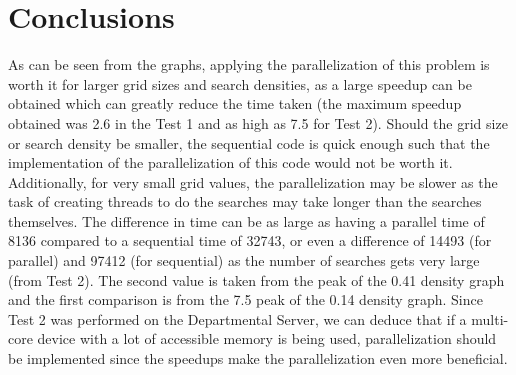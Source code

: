 \documentclass{assignment}
\begin{document}
\section{Conclusions}
As can be seen from the graphs, applying the parallelization of this problem is worth it for larger grid sizes and search densities, as a large speedup can be obtained which can greatly reduce the time taken (the maximum speedup obtained was 2.6 in the Test 1 and as high as 7.5 for Test 2). Should the grid size or search density be smaller, the sequential code is quick enough such that the implementation of the parallelization of this code would not be worth it. Additionally, for very small grid values, the parallelization may be slower as the task of creating threads to do the searches may take longer than the searches themselves. The difference in time can be as large as having a parallel time of 8136 compared to a sequential time of 32743, or even a difference of 14493 (for parallel) and 97412 (for sequential) as the number of searches gets very large (from Test 2). The second value is taken from the peak of the 0.41 density graph and the first comparison is from the 7.5 peak of the 0.14 density graph. Since Test 2 was performed on the Departmental Server, we can deduce that if a multi-core device with a lot of accessible memory is being used, parallelization should be implemented since the speedups make the parallelization even more beneficial.
\end{document}
